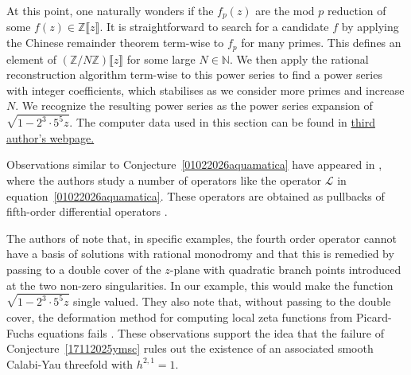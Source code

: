 \documentclass[11pt,leqno]{article}
\theoremstyle{remark}
\theoremstyle{definition}
\begin{document}
At this point, one naturally wonders if the $f_p(z)$ are the mod $p$ reduction of some $f(z)\in\mathbb{Z}\llbracket z\rrbracket$. It is straightforward to search for a candidate $f$ by applying the Chinese remainder theorem term-wise to $f_p$ for many primes. This defines an element of $\left(\mathbb{Z}/N\mathbb{Z}\right)\llbracket z\rrbracket$ for some large $N\in\mathbb{N}$. We then apply the rational reconstruction algorithm term-wise to this power series to find a power series with integer coefficients, which stabilises as we consider more primes and increase $N$. We recognize the resulting power series as the power series expansion of $\sqrt{1-2^3\cdot5^5 z}$. The computer data used in this section can be found in \href{https://w3.impa.br/~hossein/WikiHossein/files/Singular%20Codes/25_02_2026_HW_For_CY/}{third author's webpage.}

Observations similar to Conjecture~\ref{01022026aquamatica} have appeared in \cite{Ducker:2025wfl}, where the authors study a number of operators like the operator $\mathcal{L}$ in equation~\eqref{01022026aquamatica}. These operators are obtained as pullbacks of fifth-order differential operators \cite{almzud,2006math.....12215A}. 

The authors of \cite{Ducker:2025wfl} note that, in specific examples, the fourth order operator cannot have a basis of solutions with rational monodromy and that this is remedied by passing to a double cover of the $z$-plane with quadratic branch points introduced at the two non-zero singularities. In our example, this would make the function $\sqrt{1-2^3\cdot5^5 z}$ single valued. They also note that, without passing to the double cover, the deformation method for computing local zeta functions from Picard-Fuchs equations fails \cite{Candelas:2021tqt}. These observations support the idea that the failure of Conjecture~\ref{17112025ymsc} rules out the existence of an associated smooth Calabi-Yau threefold with $h^{2,1}=1$.

\end{document}
